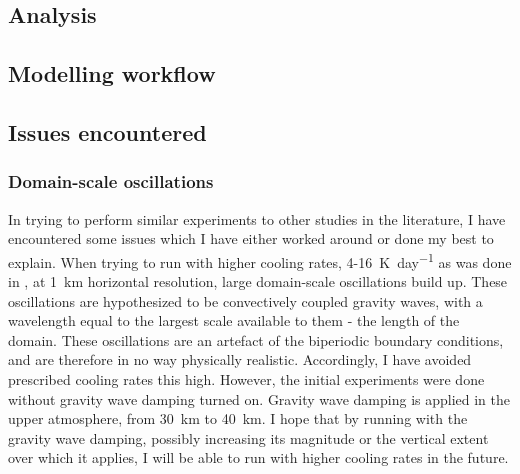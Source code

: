 \documentclass[11pt,a4paper]{article}
\begin{document}


\subsection{Analysis}
\label{sec:analysis}


\subsection{Modelling workflow}
\label{sec:modelling_workflow}






\subsection{Issues encountered}
\label{sec:issues}

\subsubsection{Domain-scale oscillations}
\label{sec:osc}
In trying to perform similar experiments to other studies in the literature, I have encountered some issues which I have either worked around or done my best to explain. When trying to run with higher cooling rates, \SI{4}{}-\SI{16}{K.day^{-1}} as was done in \cite{cohen2006fluctuations}, at \SI{1}{km} horizontal resolution, large domain-scale oscillations build up. These oscillations are hypothesized to be convectively coupled gravity waves, with a wavelength equal to the largest scale available to them - the length of the domain. These oscillations are an artefact of the biperiodic boundary conditions, and are therefore in no way physically realistic. Accordingly, I have avoided prescribed cooling rates this high. However, the initial experiments were done without gravity wave damping turned on. Gravity wave damping is applied in the upper atmosphere, from \SI{30}{km} to \SI{40}{km}. I hope that by running with the gravity wave damping, possibly increasing its magnitude or the vertical extent over which it applies, I will be able to run with higher cooling rates in the future.
\end{document}
